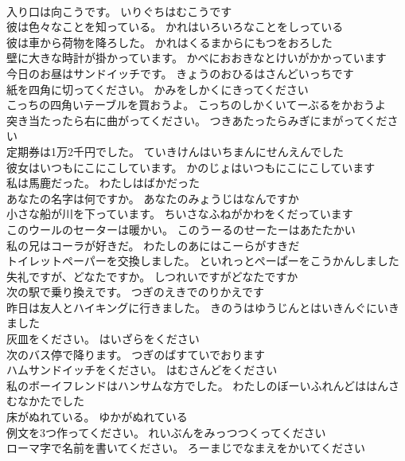 \documentclass[8pt]{extreport}
\begin{document}
\begin{CJK}{UTF8}{min}
\\	入り口は向こうです。	いりぐちはむこうです 
\\	彼は色々なことを知っている。	かれはいろいろなことをしっている 
\\	彼は車から荷物を降ろした。	かれはくるまからにもつをおろした 
\\	壁に大きな時計が掛かっています。	かべにおおきなとけいがかかっています 
\\	今日のお昼はサンドイッチです。	きょうのおひるはさんどいっちです 
\\	紙を四角に切ってください。	かみをしかくにきってください 
\\	こっちの四角いテーブルを買おうよ。	こっちのしかくいてーぶるをかおうよ 
\\	突き当たったら右に曲がってください。	つきあたったらみぎにまがってください 
\\	定期券は1万2千円でした。	ていきけんはいちまんにせんえんでした 
\\	彼女はいつもにこにこしています。	かのじょはいつもにこにこしています 
\\	私は馬鹿だった。	わたしはばかだった 
\\	あなたの名字は何ですか。	あなたのみょうじはなんですか 
\\	小さな船が川を下っています。	ちいさなふねがかわをくだっています 
\\	このウールのセーターは暖かい。	このうーるのせーたーはあたたかい 
\\	私の兄はコーラが好きだ。	わたしのあにはこーらがすきだ 
\\	トイレットペーパーを交換しました。	といれっとぺーぱーをこうかんしました 
\\	失礼ですが、どなたですか。	しつれいですがどなたですか 
\\	次の駅で乗り換えです。	つぎのえきでのりかえです 
\\	昨日は友人とハイキングに行きました。	きのうはゆうじんとはいきんぐにいきました 
\\	灰皿をください。	はいざらをください 
\\	次のバス停で降ります。	つぎのばすていでおります 
\\	ハムサンドイッチをください。	はむさんどをください 
\\	私のボーイフレンドはハンサムな方でした。	わたしのぼーいふれんどははんさむなかたでした 
\\	床がぬれている。	ゆかがぬれている 
\\	例文を3つ作ってください。	れいぶんをみっつつくってください 
\\	ローマ字で名前を書いてください。	ろーまじでなまえをかいてください 

\end{CJK}
\end{document}
